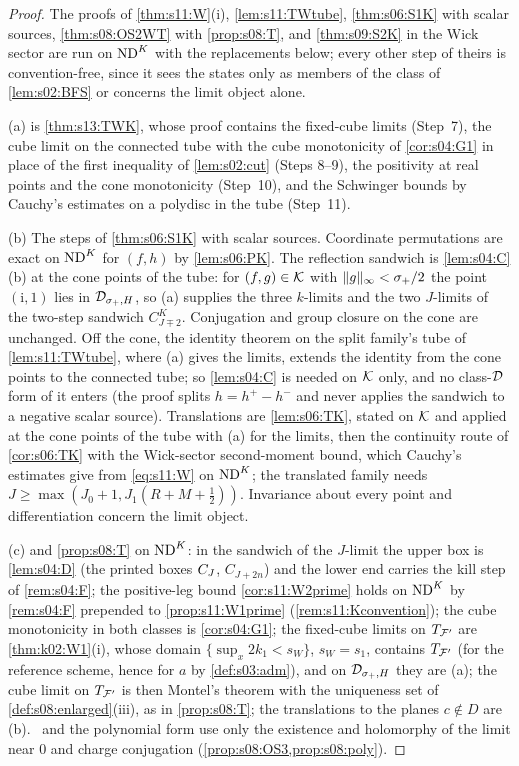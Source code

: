 \begin{proof}
The proofs of \cref{thm:s11:W}(i), \cref{lem:s11:TWtube}, \cref{thm:s06:S1K} with scalar sources, \cref{thm:s08:OS2WT} with \cref{prop:s08:T}, and \cref{thm:s09:S2K} in the Wick sector are run on $\mathrm{ND}^{K}$ with the replacements below; every other step of theirs is convention-free, since it sees the states only as members of the class of \cref{lem:s02:BFS} or concerns the limit object alone.

(a) is \cref{thm:s13:TWK}, whose proof contains the fixed-cube limits (Step~7), the cube limit on the connected tube with the cube monotonicity of \cref{cor:s04:G1} in place of the first inequality of \cref{lem:s02:cut} (Steps 8--9), the positivity at real points and the cone monotonicity (Step~10), and the Schwinger bounds by Cauchy's estimates on a polydisc in the tube (Step~11).

(b) The steps of \cref{thm:s06:S1K} with scalar sources. Coordinate permutations are exact on $\mathrm{ND}^{K}$ for $(f,h)$ by \cref{lem:s06:PK}. The reflection sandwich is \cref{lem:s04:C}(b) at the cone points of the tube: for $(f,g)\in\mathcal K$ with $\lVert g\rVert_\infty<\sigma_+/2$ the point $(\mathrm i,1)$ lies in $\mathcal D_{\sigma_+,H}$, so (a) supplies the three $k$-limits and the two $J$-limits of the two-step sandwich $C^K_{J\mp2}$. Conjugation and group closure on the cone are unchanged. Off the cone, the identity theorem on the split family's tube of \cref{lem:s11:TWtube}, where (a) gives the limits, extends the identity from the cone points to the connected tube; so \cref{lem:s04:C} is needed on $\mathcal K$ only, and no class-$\mathcal D$ form of it enters (the proof splits $h=h^+-h^-$ and never applies the sandwich to a negative scalar source). Translations are \cref{lem:s06:TK}, stated on $\mathcal K$ and applied at the cone points of the tube with (a) for the limits, then the continuity route of \cref{cor:s06:TK} with the Wick-sector second-moment bound, which Cauchy's estimates give from \eqref{eq:s11:W} on $\mathrm{ND}^{K}$; the translated family needs $J\ge\max(J_0+1,J_1(R+M+\frac12))$. Invariance about every point and differentiation concern the limit object.

(c)  and \cref{prop:s08:T} on $\mathrm{ND}^{K}$: in the sandwich of the $J$-limit the upper box is \cref{lem:s04:D} (the printed boxes $C_J$, $C_{J+2n}$) and the lower end carries the kill step of \cref{rem:s04:F}; the positive-leg bound \cref{cor:s11:W2prime} holds on $\mathrm{ND}^{K}$ by \cref{rem:s04:F} prepended to \cref{prop:s11:W1prime} (\cref{rem:s11:Kconvention}); the cube monotonicity in both classes is \cref{cor:s04:G1}; the fixed-cube limits on $T_{\mathcal F'}$ are \cref{thm:k02:W1}(i), whose domain $\{\sup_x2k_1<s_W\}$, $s_W=s_1$, contains $T_{\mathcal F'}$ (for the reference scheme, hence for $a$ by \cref{def:s03:adm}), and on $\mathcal D_{\sigma_+,H}$ they are (a); the cube limit on $T_{\mathcal F'}$ is then Montel's theorem with the uniqueness set of \cref{def:s08:enlarged}(iii), as in \cref{prop:s08:T}; the translations to the planes $c\notin D$ are (b). \OSth\ and the polynomial form use only the existence and holomorphy of the limit near $0$ and charge conjugation (\cref{prop:s08:OS3,prop:s08:poly}).


\end{proof}
